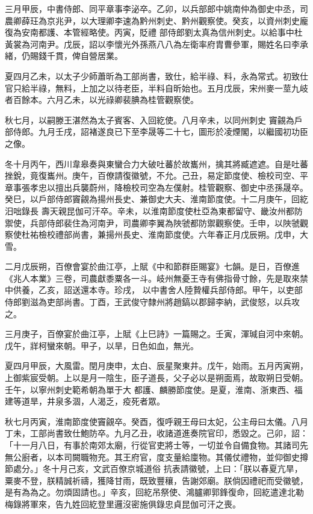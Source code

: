 \begin{pinyinscope}
 三月甲辰，中書侍郎、同平章事李泌卒。乙卯，以兵部郎中姚南仲為御史中丞，司農卿薛玨為京兆尹，以大理卿李速為黔州刺史、黔州觀察使。癸亥，以資州刺史龐復為安南都護、本管經略使。丙寅，貶禮
 部侍郎劉太真為信州刺史。以給事中杜黃裳為河南尹。戊辰，詔以李懷光外孫燕八八為左衛率府胄曹參軍，賜姓名曰李承緒，仍賜錢千貫，俾自營居業。



 夏四月乙未，以太子少師蕭昕為工部尚書，致仕，給半祿、料，永為常式。初致仕官只給半祿，無料，上加之以待老臣，半料自昕始也。五月戊辰，宋州麥一莖九岐者百餘本。六月乙未，以光祿卿裴腆為桂管觀察使。



 秋七月，以嗣滕王湛然為太子賓客、入回紇使。八月辛未，以同州刺史
 竇覦為戶部侍郎。九月壬戌，詔褚遂良已下至李晟等二十七，圖形於凌煙閣，以繼國初功臣之像。



 冬十月丙午，西川韋皋奏與東蠻合力大破吐蕃於故巂州，擒其將臧遮遮。自是吐蕃挫銳，竟復巂州。庚午，百僚請復徽號，不允。己丑，易定節度使、檢校司空、平章事張孝忠以擅出兵襲蔚州，降檢校司空為左僕射。桂管觀察、御史中丞孫晟卒。癸巳，以戶部侍郎竇覦為揚州長史、兼御史大夫、淮南節度使。十二月庚午，回紇汨咄錄長
 壽天親昆伽可汗卒。辛未，以淮南節度使杜亞為東都留守、畿汝州都防禦使，兵部侍郎裴住為河南尹，司農卿李翼為陜虢都防禦觀察使。壬申，以陜虢觀察使杜祐檢校禮部尚書，兼揚州長史、淮南節度使。六年春正月戊辰朔。戊申，大雪。



 二月戊辰朔，百僚會宴於曲江亭，上賦《中和節群臣賜宴》七韻。是日，百僚進《兆人本業》三卷，司農獻黍粟各一斗。岐州無憂王寺有佛指骨寸餘，先是取來禁中供養，乙亥，詔送還本寺。珍戌，
 以中書舍人陸贄權兵部侍郎。甲午，以吏部侍郎劉滋為吏部尚書。丁酉，王武俊守隸州將趙鎬以郡歸李納，武俊怒，以兵攻之。



 三月庚子，百僚宴於曲江亭，上賦《上巳詩》一篇賜之。壬寅，渾瑊自河中來朝。戊午，牂柯蠻來朝。甲子，以旱，日色如血，無光。



 夏四月甲辰，大風雷。閏月庚申，太白、辰星聚東井。戊午，始雨。五月丙寅朔，上御紫宸受朝。上以是月一陰生，臣子道長，父子必以是朔面焉，故取朔日受朝。壬午，以寧州刺史範希朝為單于大
 都護、麟勝節度使。是夏，淮南、浙東西、福建等道旱，井泉多涸，人渴乏，疫死者眾。



 秋七月丙寅，淮南節度使竇覦卒。癸酉，復呼親王母曰太妃，公主母曰太儀。八月丁未，工部尚書致仕鮑防卒。九月乙丑，收諸道進奏院官印，悉毀之。己卯，詔：「十一月八日，有事於南郊太廟，行從官吏將士等，一切並令自備食物。其諸司先無公廚者，以本司闕職物充。其王府官，度支量給廩物。其儀仗禮物，並仰御史撙節處分。」冬十月己亥，文武百僚京城道俗
 抗表請徽號，上曰：「朕以春夏亢旱，粟麥不登，朕精誠祈禱，獲降甘雨，既致豐穰，告謝郊廟。朕倘因禮祀而受徽號，是有為為之。勿煩固請也。」辛亥，回紇吊祭使、鴻臚卿郭鋒復命，回紇遣達北勒梅錄將軍來，告九姓回紇登里邏沒密施俱錄忠貞昆伽可汗之喪。




\end{pinyinscope}
